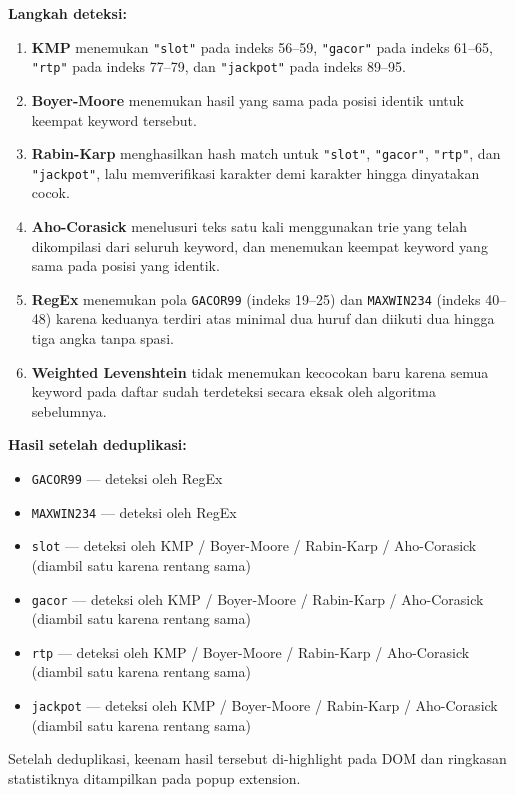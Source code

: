 \textbf{Langkah deteksi:}
\begin{enumerate}
    \item \textbf{KMP} menemukan \texttt{"slot"} pada indeks 56--59,
    \texttt{"gacor"} pada indeks 61--65, \texttt{"rtp"} pada indeks 77--79,
    dan \texttt{"jackpot"} pada indeks 89--95.
    \item \textbf{Boyer-Moore} menemukan hasil yang sama pada posisi
    identik untuk keempat keyword tersebut.
    \item \textbf{Rabin-Karp} menghasilkan hash match untuk \texttt{"slot"},
    \texttt{"gacor"}, \texttt{"rtp"}, dan \texttt{"jackpot"}, lalu
    memverifikasi karakter demi karakter hingga dinyatakan cocok.
    \item \textbf{Aho-Corasick} menelusuri teks satu kali menggunakan trie
    yang telah dikompilasi dari seluruh keyword, dan menemukan keempat
    keyword yang sama pada posisi yang identik.
    \item \textbf{RegEx} menemukan pola \texttt{GACOR99} (indeks 19--25)
    dan \texttt{MAXWIN234} (indeks 40--48) karena keduanya terdiri atas
    minimal dua huruf dan diikuti dua hingga tiga angka tanpa spasi.
    \item \textbf{Weighted Levenshtein} tidak menemukan kecocokan baru
    karena semua keyword pada daftar sudah terdeteksi secara eksak oleh
    algoritma sebelumnya.
\end{enumerate}

\textbf{Hasil setelah deduplikasi:}
\begin{itemize}
    \item \texttt{GACOR99} --- deteksi oleh RegEx
    \item \texttt{MAXWIN234} --- deteksi oleh RegEx
    \item \texttt{slot} --- deteksi oleh KMP / Boyer-Moore / Rabin-Karp / Aho-Corasick
    (diambil satu karena rentang sama)
    \item \texttt{gacor} --- deteksi oleh KMP / Boyer-Moore / Rabin-Karp / Aho-Corasick
    (diambil satu karena rentang sama)
    \item \texttt{rtp} --- deteksi oleh KMP / Boyer-Moore / Rabin-Karp / Aho-Corasick
    (diambil satu karena rentang sama)
    \item \texttt{jackpot} --- deteksi oleh KMP / Boyer-Moore / Rabin-Karp / Aho-Corasick
    (diambil satu karena rentang sama)
\end{itemize}

Setelah deduplikasi, keenam hasil tersebut di-highlight pada DOM dan
ringkasan statistiknya ditampilkan pada popup extension.

